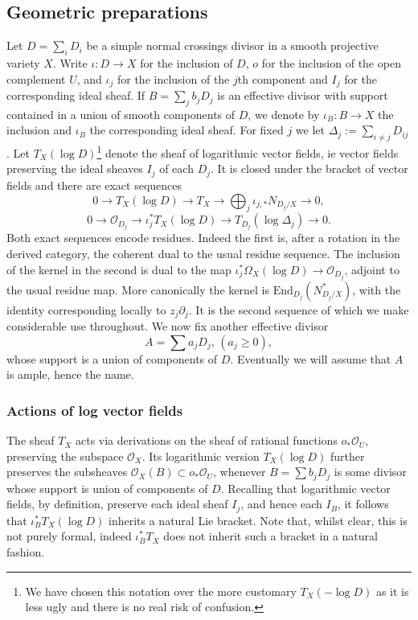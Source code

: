 \documentclass[12pt, oneside]{amsart}       %
\theoremstyle{remark}
\renewcommand{\geq}{\geqslant}
\newcommand{\OO}{\mathcal{O}}
\begin{document}
\subsection{Geometric preparations}Let $D=\sum_i D_i$ be a simple normal crossings divisor in a smooth projective variety $X$. Write $\iota:D\to X$ for the inclusion of $D$, $o$ for the inclusion of the open complement $U$, and $\iota_j$ for the inclusion of the $j$th component and $I_j$ for the corresponding ideal sheaf. If $B=\sum_j b_j D_j$ is an effective divisor with support contained in a union of smooth components of $D$, we denote by $\iota_B:B\to X$ the inclusion and $\iota_B$ the corresponding ideal sheaf. For fixed $j$ we let $\Delta_j:=\sum_{i\neq j}D_{ij}$. Let $T_X(\log D)$\footnote{We have chosen this notation over the more customary $T_X(-\log D)$ as it is less ugly and there is no real risk of confusion.} denote the sheaf of logarithmic vector fields, ie vector fields preserving the ideal sheaves $I_j$ of each $D_j$. It is closed under the bracket of vector fields and there are exact sequences
$$0\to T_X(\log D)\to T_X\to\bigoplus_j\iota_{j,*}N_{D_j/X}\to0,$$
$$0\to\OO_{D_j}\to\iota_j^*T_X(\log D)\to T_{D_j}(\log\Delta_j)\to0.$$
 Both exact sequences encode residues. Indeed the first is, after a rotation in the derived category, the coherent dual to the usual residue sequence. The inclusion of the kernel in the second is dual to the map $\iota_j^*\Omega_X(\log D)\to\OO_{D_j}$, adjoint to the usual residue map. More canonically the kernel is $\mathrm{End}_{D_j}(N^*_{D_j/X})$, with the identity corresponding locally to $z_j\partial_j$. It is the second sequence of which we make considerable use throughout. We now fix another effective divisor $$A=\sum a_jD_j, \,(a_j\geq 0),$$ whose support is a union of components of $D$. Eventually we will assume that $A$ is ample, hence the name. 
 
\subsubsection{Actions of log vector fields} The sheaf $T_X$ acts via derivations on the sheaf of rational functions $o_*\OO_U$, preserving the subspace $\OO_X$. Its logarithmic version $T_X(\log D)$ further preserves the subsheaves $\OO_X(B)\subset o_*\OO_U$, whenever $B=\sum b_j D_j$ is some divisor whose support is union of components of $D$. Recalling that logarithmic vector fields, by definition, preserve each ideal sheaf $I_j$, and hence each $I_B$, it follows that $\iota_B^*T_X(\log D)$ inherits a natural Lie bracket. Note that, whilst clear, this is not purely formal, indeed $\iota_B^*T_X$ does not inherit such a bracket in a natural fashion.  
\end{document}
